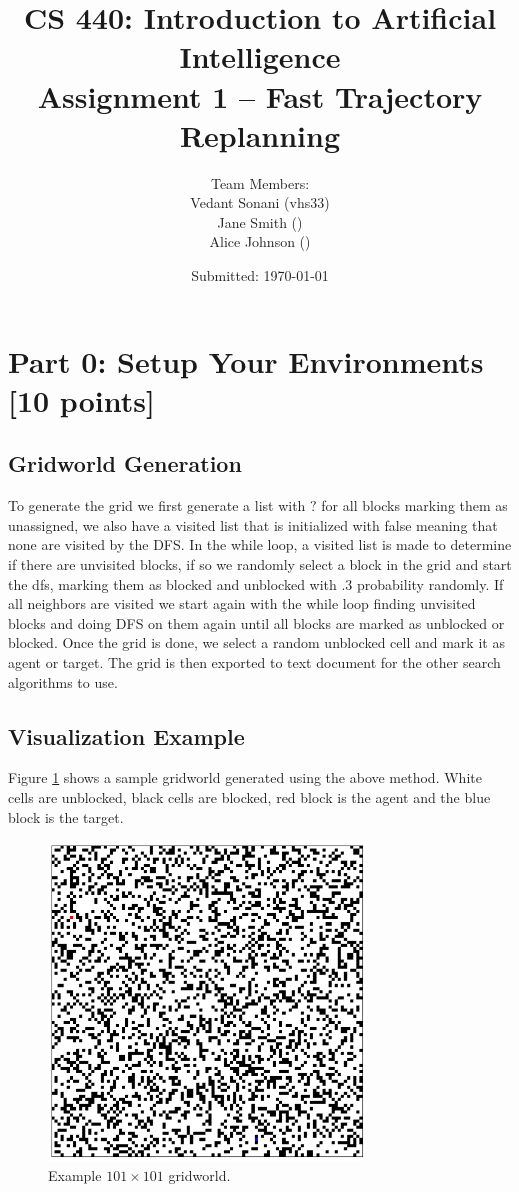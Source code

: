 \documentclass[12pt]{article}
\title{CS 440: Introduction to Artificial Intelligence \\ Assignment 1 -- Fast Trajectory Replanning}
\author{Team Members: \\ 
Vedant Sonani (vhs33) \\ 
Jane Smith (\ruid) \\ 
Alice Johnson (\ruid)}
\date{Submitted: \today}
\begin{document}
\maketitle

\section*{Part 0: Setup Your Environments [10 points]}
\label{sec:part0}

\subsection*{Gridworld Generation}
To generate the grid we first generate a list with $?$ for all blocks marking them as unassigned, we also have a visited list that is initialized with false meaning that none are visited by the DFS. In the while loop, a visited list is made to determine if there are unvisited blocks, if so we randomly select a block in the grid and start the dfs, marking them as blocked and unblocked with .3 probability randomly. If all neighbors are visited we start again with the while loop finding unvisited blocks and doing DFS on them again until all blocks are marked as unblocked or blocked. Once the grid is done, we select a random unblocked cell and mark it as agent or target. The grid is then exported to text document for the other search algorithms to use.

\subsection*{Visualization Example}
Figure \ref{fig:gridworld} shows a sample gridworld generated using the above method. White cells are unblocked, black cells are blocked, red block is the agent and the blue block is the target.

\begin{figure}[ht]
    \centering
    \includegraphics[width=0.75\textwidth]{Figure_1.png}
    \caption{Example \(101 \times 101\) gridworld.}
    \label{fig:gridworld}
\end{figure}
\end{document}
